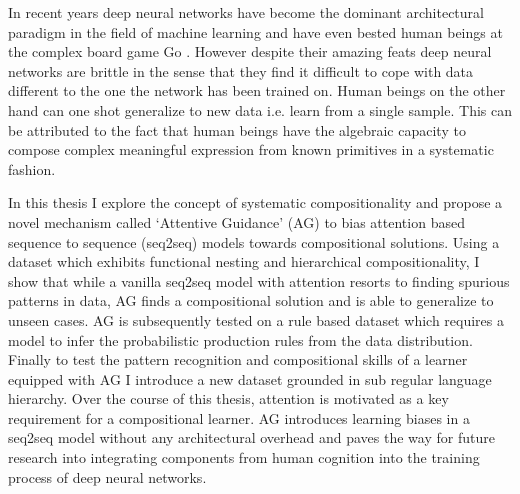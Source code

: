 	In recent years deep neural networks have become the dominant architectural paradigm in the field of machine learning and have even bested human beings at the complex board game Go \citep{Silver2016}. However despite their amazing feats deep neural networks are brittle in the sense that they find it difficult to cope with data different to the one the network has been trained on. Human beings on the other hand can one shot generalize to new data i.e. learn from a single sample. This can be attributed to the fact that human beings have the algebraic capacity \citep{marcus2003algebraic} to compose complex meaningful expression from known primitives in a systematic fashion.
	
	In this thesis I explore the concept of systematic compositionality and propose a novel mechanism called \lq Attentive Guidance\rq{} (AG) to bias attention based sequence to sequence (seq2seq) models towards compositional solutions. Using a dataset which exhibits functional nesting and hierarchical compositionality, I show that while a vanilla seq2seq model with attention resorts to finding spurious patterns in data, AG finds a compositional solution and is able to generalize to unseen cases. AG is subsequently tested on a rule based dataset which requires a model to infer the probabilistic production rules from the data distribution. Finally to test the pattern recognition and compositional skills of a learner equipped with AG I introduce a new dataset grounded in sub regular language hierarchy. Over the course of this thesis, attention is motivated as a key requirement for a compositional learner. AG introduces learning biases in a seq2seq model without any architectural overhead and paves the way for future research into integrating components from human cognition into the training process of deep neural networks.


